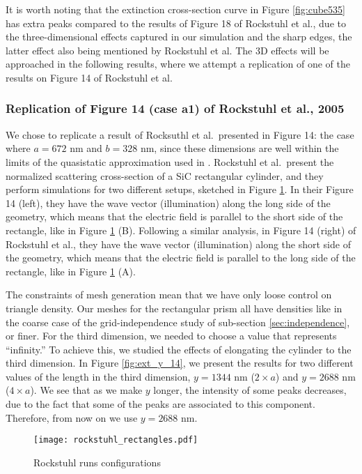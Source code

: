It is worth noting that the extinction cross-section curve in Figure \ref{fig:cube535} has extra peaks 
compared to the results of Figure 18 of Rockstuhl et al., due to the three-dimensional effects captured in our simulation and the sharp 
edges, the latter effect also being mentioned by Rockstuhl et al. The 3D effects will be approached
in the following results, where we attempt a replication of one of the results on Figure 14 of Rockstuhl et al. 

\subsubsection{Replication of Figure 14 (case a1) of Rockstuhl et al., 2005}

We chose to replicate a result of Rocksuthl et al.\ presented in Figure 14: 
the case where $a=672$ nm 
and $b=328$ nm, since these dimensions are well within the limits of the quasistatic approximation 
used in \pygbe. Rockstuhl et al.\ present the normalized scattering cross-section of a SiC rectangular 
cylinder, and they perform simulations for two different setups, sketched in Figure \ref{fig:rectangle_sketch}. In 
their Figure 14 (left), they have the wave vector (illumination) along the long 
side of the geometry, which means that the electric field is parallel to the short side of the rectangle, like in 
Figure \ref{fig:rectangle_sketch} (B). Following a similar analysis, in Figure 14 (right) of Rockstuhl et al., they have the wave 
vector (illumination) along the short side of the geometry, which means that the electric field is parallel to the 
long side of the rectangle, like in Figure \ref{fig:rectangle_sketch} (A). 

The constraints of mesh generation mean that we have only loose control on triangle density. Our meshes for the rectangular prism all have densities like in the coarse case of the grid-independence study of sub-section \ref{sec:independence}, or finer.
For the third dimension, we needed to choose a value that represents ``infinity.'' To achieve this, we studied the effects of 
elongating the cylinder to the third dimension. In Figure \ref{fig:ext_y_14}, we present the results for two different
values of the length in the third dimension, $y=1344$ nm ($2\times a$) and $y=2688$ nm ($4\times a$). We see that as we make $y$ longer, the 
intensity of some peaks decreases, due to the fact that some of the peaks are associated to this component. Therefore, 
from now on we use $y=2688$ nm. 

\begin{figure}
    \centering
    \texttt{[image: rockstuhl\_rectangles.pdf]} 
    \caption{Rockstuhl runs configurations}
    \label{fig:rectangle_sketch}
\end{figure}

